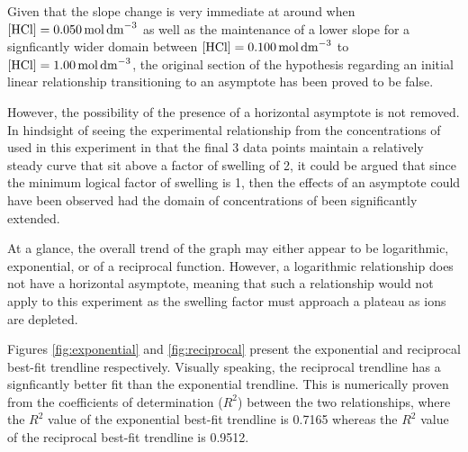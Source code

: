 \documentclass[11pt, letterpaper]{article}
\begin{document}
Given that the slope change is very immediate at around when \(\ce{[HCl]} = \SI{0.050}{mol.dm^{-3}}\)
as well as the maintenance of a lower slope for a signficantly wider domain
between \(\ce{[HCl]} = \SI{0.100}{mol.dm^{-3}}\) to \(\ce{[HCl]} = \SI{1.00}{mol.dm^{-3}}\),
the original section of the hypothesis regarding an initial linear relationship
transitioning to an asymptote has been proved to be false.

However, the possibility of the presence of a horizontal asymptote is not
removed. In hindsight of seeing the experimental relationship from the concentrations
of  used in this experiment in that the final 3 data points maintain
a relatively steady curve that sit above a factor of swelling of 2,
it could be argued that since the minimum logical factor of swelling is 1, then the effects of an asymptote could have been observed had
the domain of concentrations of  been significantly extended.

At a glance, the overall trend of the graph may either appear to be logarithmic,
exponential, or of a reciprocal function. However, a logarithmic relationship
does not have a horizontal asymptote, meaning that such a relationship would
not apply to this experiment as the swelling factor must approach a plateau
as  ions are depleted.

Figures \ref*{fig:exponential} and \ref*{fig:reciprocal} present the
exponential and reciprocal best-fit trendline respectively.
Visually speaking, the reciprocal trendline has a signficantly
better fit than the exponential trendline. This is numerically
proven from the coefficients of determination (\(R^2\)) between the two
relationships, where the \(R^2\) value of the exponential best-fit trendline
is 0.7165 whereas the \(R^2\) value of the reciprocal best-fit trendline
is 0.9512.
\end{document}
